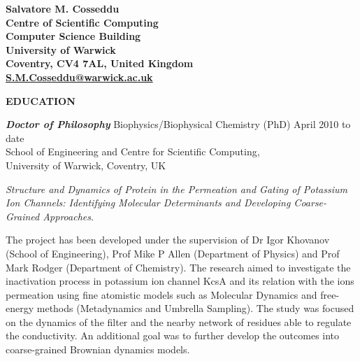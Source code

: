 \documentclass[a4paper,11pt,final]{memoir}
\newcommand{\Sep}{\vspace{1.em}}
\newcommand{\SmallSep}{\vspace{0.2em}}
\newcommand{\CVSection}[1]
	{\Large\textbf{#1}\par
	\SmallSep\normalsize\normalfont}
\newcommand{\CVItem}[2]
	{\textit{\textbf{\color{RoyalBlue} #1}} #2}
\begin{document}
\Huge\bfseries {\color{RoyalBlue} Salvatore M. Cosseddu} \\
\small
Centre of Scientific Computing \\
Computer Science Building \\
University of Warwick \\
Coventry, CV4 7AL, United Kingdom \\
\url{S.M.Cosseddu@warwick.ac.uk}
\normalsize\normalfont
\SmallSep
\Sep

\CVSection{EDUCATION}
\CVItem{ Doctor of Philosophy}{Biophysics/Biophysical Chemistry (PhD) \hfill April 2010 to date} \\
School of Engineering and Centre for Scientific Computing, \\
University of Warwick, Coventry, UK %
\begin{description} [style=multiline,leftmargin=3cm,font=\normalfont] \itemsep -1.5pt
\item [Thesis:] \textit{Structure and Dynamics of Protein in the Permeation and Gating of
  Potassium Ion Channels: Identifying Molecular Determinants and Developing Coarse-Grained
  Approaches}.
\item [Research description:] The project has been developed under the supervision of Dr
  Igor Khovanov (School of Engineering), Prof Mike P Allen (Department of Physics) and
  Prof Mark Rodger (Department of Chemistry). The research aimed to investigate the
  inactivation process in potassium ion channel KcsA and its relation with the ions
  permeation using fine atomistic models such as Molecular Dynamics and free-energy
  methods (Metadynamics and Umbrella Sampling). The study was focused on the dynamics of
  the filter and the nearby network of residues able to regulate the conductivity. An
  additional goal was to further develop the outcomes into coarse-grained Brownian dynamics
  models. 
\end{description}
\SmallSep
\end{document}
